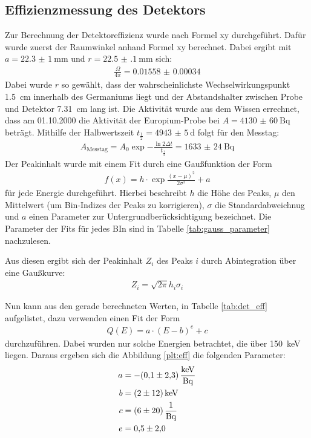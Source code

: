 
\FloatBarrier

\subsection{Effizienzmessung des Detektors}
\label{sec:Effizienzmessung}
Zur Berechnung der Detektoreffizienz wurde nach Formel xy durchgeführt.  %
Dafür wurde zuerst der Raumwinkel anhand Formel xy berechnet. Dabei  %
ergibt mit $a = \SI{22.3(10)}{\milli\meter}$ und $r = \SI{22.5(1)}{\milli\meter}$
sich:
\begin{align*}
  \frac{\Omega}{4\pi} = \num{0.01558(34)}
\end{align*}
Dabei wurde $r$ so gewählt, dass der wahrscheinlichste Wechselwirkungspunkt
\SI{1.5}{\centi\meter} innerhalb des Germaniums liegt und der Abstandshalter
zwischen Probe und Detektor \SI{7.31}{\centi\meter} lang ist.
Die Aktivität wurde aus dem Wissen errechnet, dass am 01.10.2000 die Aktivität
der Europium-Probe bei $A = \SI{4130(60)}{\becquerel}$ beträgt. Mithilfe der
Halbwertszeit $t_\frac{1}{2} = \SI{4943(5)}{\day}$ folgt für den Messtag:
\begin{align*}
    A_\text{Messtag} = A_0 \exp{-\frac{\ln{2} \Delta t}{t_\frac{1}{2}}}=\SI{1633(24)}{\becquerel}
\end{align*}
Der Peakinhalt wurde mit einem Fit durch eine Gaußfunktion der Form
\begin{align*}
  f(x) = h\cdot \exp{\frac{(x-\mu)^2}{2\sigma^2}} + a
\end{align*}
für jede Energie durchgeführt. Hierbei beschreibt $h$ die Höhe des Peaks, $\mu$
den Mittelwert (um Bin-Indizes der Peaks zu korrigieren), $\sigma$ die
Standardabweichnug und $a$ einen Parameter zur Untergrundberücksichtigung
bezeichnet. Die Parameter der Fits für jedes BIn sind in Tabelle
\ref{tab:gauss_parameter} nachzulesen.


\FloatBarrier

Aus diesen ergibt sich der Peakinhalt $Z_i$ des Peaks $i$ durch Abintegration
über eine Gaußkurve:
\begin{align*}
  Z_i = \sqrt{2\pi} h_i \sigma_i
\end{align*}

Nun kann aus den gerade berechneten Werten, in Tabelle \ref{tab:det_eff}
aufgelistet, dazu verwenden einen Fit der Form
\begin{align*}
  Q(E) = a \cdot (E - b)^e + c
\end{align*}
durchzuführen. Dabei wurden nur solche Energien betrachtet, die über
\SI{150}{\kilo\electronvolt} liegen. Daraus ergeben sich die Abbildung
\ref{plt:eff} die folgenden Parameter:
\begin{align*}
  a &= -\SI{0.1(23)}{\kilo\electronvolt\per\becquerel} \\
  b &= \SI{2(12)}{\kilo\electronvolt} \\
  c &= \SI{6(20)}{\raiseto{-1}\becquerel} \\
  e &= \num{0.5(20)}
\end{align*}

